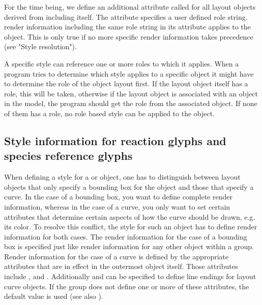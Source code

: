 For the time being, we define an additional attribute called  for all 
layout objects derived from \GraphicalObject including \GraphicalObject itself.
The attribute specifies a user defined role string. render information including the same role string in its
 attribute applies to the object. This is only true if no more specific render information
takes precedence (see "Style resolution").
 
A specific style can reference one or more roles to which it applies. When a program tries to determine which style applies to a 
specific object it might have to determine the role of the object layout first. If the 
layout object itself has a role, this will be taken, otherwise if the layout object 
is associated with an object in the model, the program should get the role from 
the associated object. If none of them has a role, no role based style can be 
applied to the object.

\subsection{Style information for reaction glyphs and species reference glyphs}

When defining a style for a  or  object, one 
has to distinguish between layout objects that only specify a bounding box for the 
object and those that specify a curve. In the case of a bounding box, you want to 
define complete render information, whereas in the case of a curve, you only 
want to set certain attributes that determine certain aspects of how the 
curve should be drawn, e.g. its color. To resolve this conflict, the style for such an 
object has to define render information for both cases. The render information 
for the case of a bounding box is specified just like render information for 
any other object within a group. Render information for the case of a curve is 
defined by the appropriate attributes that are in effect in the outermost \RenderGroup 
object itself. Those attributes include ,  
and . Additionally  and  can be 
specified to define line endings for layout curve objects. If the group does not define 
one or more of these attributes, the default value is used (see also ).

